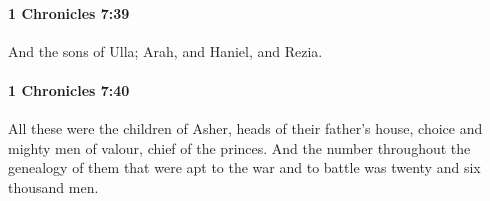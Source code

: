 		\paragraph{1 Chronicles 7:39} %
			\label{1CHRONICLES-7-39}

			And the sons of Ulla; Arah, and Haniel, and Rezia.


		\paragraph{1 Chronicles 7:40} %
			\label{1CHRONICLES-7-40}

			All these were the children of Asher, heads of their father’s house, choice and mighty men of valour, chief of the princes. And the number throughout the genealogy of them that were apt to the war and to battle was twenty and six thousand men.


